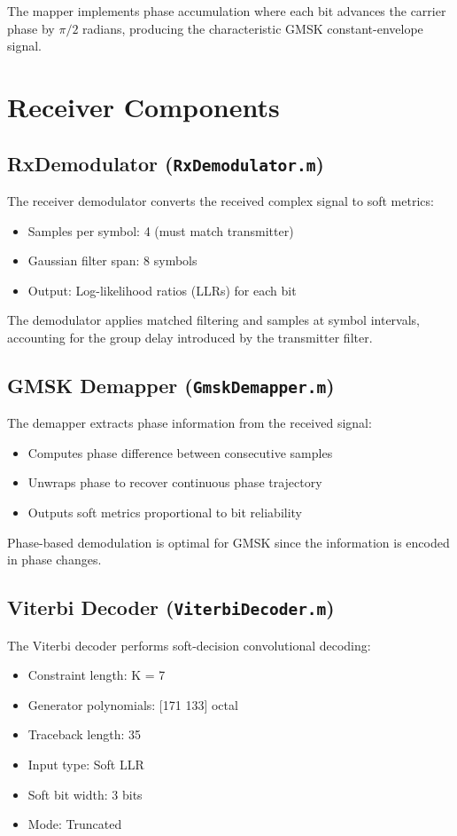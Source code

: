 \documentclass[12pt]{article}
\begin{document}
The mapper implements phase accumulation where each bit advances the carrier phase by $\pi/2$ radians, producing the characteristic GMSK constant-envelope signal.

\section{Receiver Components}

\subsection{RxDemodulator (\texttt{RxDemodulator.m})}
The receiver demodulator converts the received complex signal to soft metrics:
\begin{itemize}
    \item Samples per symbol: 4 (must match transmitter)
    \item Gaussian filter span: 8 symbols
    \item Output: Log-likelihood ratios (LLRs) for each bit
\end{itemize}

The demodulator applies matched filtering and samples at symbol intervals, accounting for the group delay introduced by the transmitter filter.

\subsection{GMSK Demapper (\texttt{GmskDemapper.m})}
The demapper extracts phase information from the received signal:
\begin{itemize}
    \item Computes phase difference between consecutive samples
    \item Unwraps phase to recover continuous phase trajectory
    \item Outputs soft metrics proportional to bit reliability
\end{itemize}

Phase-based demodulation is optimal for GMSK since the information is encoded in phase changes.

\subsection{Viterbi Decoder (\texttt{ViterbiDecoder.m})}
The Viterbi decoder performs soft-decision convolutional decoding:
\begin{itemize}
    \item Constraint length: K = 7
    \item Generator polynomials: [171 133] octal
    \item Traceback length: 35
    \item Input type: Soft LLR
    \item Soft bit width: 3 bits
    \item Mode: Truncated
\end{itemize}
\end{document}

